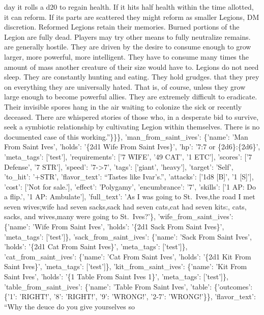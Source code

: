 \documentclass[
  letterpaper,
  DIV=11,
  numbers=noendperiod]{scrartcl}
\begin{document}
{day it rolls a d20 to regain health. If it hits half health within the
time allotted, it can reform. If its parts are scattered they might
reform as smaller Legions, DM discretion. Reformed Legions retain their
memories. Burned portions of the Legion are fully dead. Players may try
other means to fully neutralize remains. \n\nLegions are generally
hostile. They are driven by the desire to consume enough to grow larger,
more powerful, more intelligent. They have to consume many times the
amount of mass another creature of their size would have to. Legions do
not need sleep. They are constantly hunting and eating. They hold
grudges. \n\nGiven that they prey on everything they are universally
hated. That is, of course, unless they grow large enough to become
powerful allies. They are extremely difficult to eradicate. Their
invisible spores hang in the air waiting to colonize the sick or
recently deceased. There are whispered stories of those who, in a
desperate bid to survive, seek a symbiotic relationship by cultivating
Legion within themselves. There is no documented case of this
working.''\}\}\}, 'man\_from\_saint\_ives': \{'name': 'Man From Saint
Ives', 'holds': '\{2d1 Wife From Saint Ives\}', 'hp': '7:7 or
\{2d6\}:\{2d6\}', 'meta\_tags': {[}'test'{]}, 'requirements': {[}'7
WIFE', '49 CAT', '1 ETC'{]}, 'scores': {[}'7 Defense', '7 STR'{]},
'speed': '7-\textgreater7', 'tags': {[}'giant', 'heavy'{]}, 'target':
'Self', 'to\_hit': '+STR', 'flavor\_text': ``Tastes like Ivar's.'',
'attacks': {[}'1d8 {[}B{]}', '1 {[}S{]}'{]}, 'cost': {[}'Not for
sale.'{]}, 'effect': 'Polygamy', 'encumbrance': '7', 'skills': {[}'1 AP:
Do a flip.', '1 AP: Ambulate'{]}, 'full\_text': 'As I was going to
St.~Ives,\nUpon the road I met seven wives;\nEvery wife had seven
sacks,\nEvery sack had seven cats,\nEvery cat had seven kits:\nKits,
cats, sacks, and wives,\nHow many were going to St.~Ives?'\},
'wife\_from\_saint\_ives': \{'name': 'Wife From Saint Ives', 'holds':
'\{2d1 Sack From Saint Ives\}', 'meta\_tags': {[}'test'{]}\},
'sack\_from\_saint\_ives': \{'name': 'Sack From Saint Ives', 'holds':
'\{2d1 Cat From Saint Ives\}', 'meta\_tags': {[}'test'{]}\},
'cat\_from\_saint\_ives': \{'name': 'Cat From Saint Ives', 'holds':
'\{2d1 Kit From Saint Ives\}', 'meta\_tags': {[}'test'{]}\},
'kit\_from\_saint\_ives': \{'name': 'Kit From Saint Ives', 'holds': '\{1
Table From Saint Ives 1\}', 'meta\_tags': {[}'test'{]}\},
'table\_from\_saint\_ives': \{'name': 'Table From Saint Ives', 'table':
\{'outcomes': \{'1': 'RIGHT!', '8': 'RIGHT!', '9': 'WRONG!', '2-7':
'WRONG!'\}\}, 'flavor\_text': ``Why the deuce do you give yourselves so
}
\end{document}
